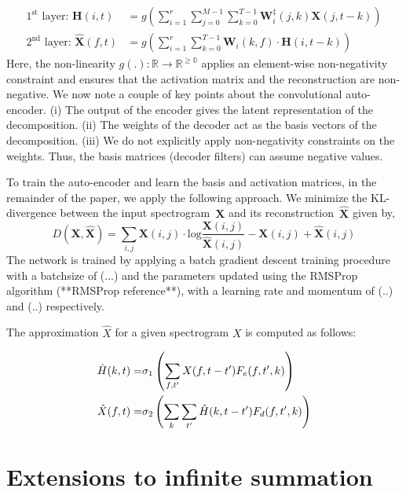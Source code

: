 \documentclass{article}
\begin{document}
\begin{align}
    \text{$1^{\text{st}}$ layer:~}\mathbf{H}(i,t) &= g\left(\sum_{i=1}^{r} \sum_{j=0}^{M-1} \sum_{k=0}^{T-1} \mathbf{W}_{i}^{\ddagger}(j,k)\mathbf{X}(j,t-k)\right) \\
    \text{$2^{\text{nd}}$ layer:~}\hat{\mathbf{X}}(f,t) &= g\left(\sum_{i=1}^{r} \sum_{k=0}^{T-1} \mathbf{W}_{i}(k,f)\cdot\mathbf{H}(i,t-k)\right)
    \label{eq:nmfcnncnn}
\end{align}
Here, the non-linearity $g(.):\mathbb{R}\rightarrow \mathbb{R^{\geq0}}$ applies an element-wise non-negativity constraint and ensures that the activation matrix and the reconstruction are non-negative. We now note a couple of key points about the convolutional auto-encoder. (i) The output of the encoder gives the latent representation of the decomposition. (ii) The weights of the decoder act as the basis vectors of the decomposition. (iii) We do not explicitly apply non-negativity constraints on the weights. Thus, the basis matrices (decoder filters) can assume negative values. 

To train the auto-encoder and learn the basis and activation matrices, in the remainder of the paper, we apply the following approach. We minimize the KL-divergence between the input spectrogram~$\mathbf{X}$ and its reconstruction~$\hat{\mathbf{X}}$ given by,
\begin{equation*}
    D\left(\mathbf{X},\hat{\mathbf{X}}\right) = \sum_{i,j} \mathbf{X}(i,j)\cdot \text{log}\frac{\mathbf{X}(i,j)}{\hat{\mathbf{X}}(i,j)} - \mathbf{X}(i,j) + \hat{\mathbf{X}}(i,j)
\end{equation*}
The network is trained by applying a batch gradient descent training procedure with a batchsize of (...) and the parameters updated using the RMSProp algorithm (**RMSProp reference**), with a learning rate and momentum of (..) and (..) respectively. 

The approximation $\hat X$ for a given spectrogram $X$ is computed as follows: 

\begin{align}
	\hat H(k,t) =& \sigma_1\left ( \sum_{f,t'} X(f,t-t') F_e(f,t',k) \right ) \notag \\
	\hat X(f,t) =& \sigma_2 \left ( \sum_k \sum_{t'} \hat H(k,t-t') F_d(f, t',k) \right )
\end{align}



\section{Extensions to infinite summation}
\label{sec:rnncnn}
\end{document}
